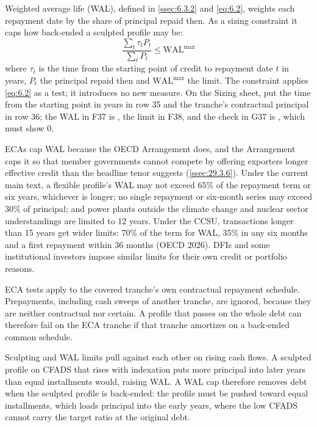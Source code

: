 Weighted average life (WAL), defined in \cref{ssec:6.3.2} and \cref{eq:6.2}, weights each repayment date by the share of principal repaid then. As a sizing constraint it caps how back-ended a sculpted profile may be:
\begin{equation}\label{eq:36.7}
\frac{\sum_t \tau_t P_t}{\sum_t P_t} \le \mathrm{WAL}^{\max}
\end{equation}
where $\tau_t$ is the time from the starting point of credit to repayment date $t$ in years, $P_t$ the principal repaid then and $\mathrm{WAL}^{\max}$ the limit. The constraint applies \cref{eq:6.2} as a test; it introduces no new measure. On the Sizing sheet, put the time from the starting point in years in row 35 and the tranche's contractual principal in row 36; the WAL in F37 is , the limit in F38, and the check in G37 is , which must show 0.

ECAs cap WAL because the OECD Arrangement does, and the Arrangement caps it so that member governments cannot compete by offering exporters longer effective credit than the headline tenor suggests (\cref{ssec:29.3.6}). Under the current main text, a flexible profile's WAL may not exceed 65\% of the repayment term or six years, whichever is longer; no single repayment or six-month series may exceed 30\% of principal; and power plants outside the climate change and nuclear sector understandings are limited to 12 years. Under the CCSU, transactions longer than 15 years get wider limits: 70\% of the term for WAL, 35\% in any six months and a first repayment within 36 months (OECD 2026). DFIs and some institutional investors impose similar limits for their own credit or portfolio reasons.

ECA tests apply to the covered tranche's own contractual repayment schedule. Prepayments, including cash sweeps of another tranche, are ignored, because they are neither contractual nor certain. A profile that passes on the whole debt can therefore fail on the ECA tranche if that tranche amortizes on a back-ended common schedule.

Sculpting and WAL limits pull against each other on rising cash flows. A sculpted profile on CFADS that rises with indexation puts more principal into later years than equal installments would, raising WAL. A WAL cap therefore removes debt when the sculpted profile is back-ended: the profile must be pushed toward equal installments, which loads principal into the early years, where the low CFADS cannot carry the target ratio at the original debt.

